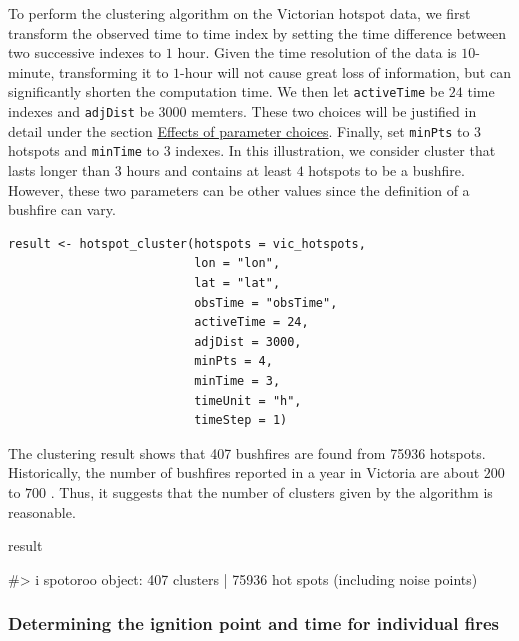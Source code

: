 To perform the clustering algorithm on the Victorian hotspot data, we
first transform the observed time to time index by setting the time
difference between two successive indexes to \(1\) hour. Given the time
resolution of the data is \(10\)-minute, transforming it to \(1\)-hour
will not cause great loss of information, but can significantly shorten
the computation time. We then let \texttt{activeTime} be \(24\) time
indexes and \texttt{adjDist} be \(3000\) memters. These two choices will
be justified in detail under the section
\protect\hyperlink{effects-of-parameter-choices}{Effects of parameter
choices}. Finally, set \texttt{minPts} to \(3\) hotspots and
\texttt{minTime} to \(3\) indexes. In this illustration, we consider
cluster that lasts longer than \(3\) hours and contains at least \(4\)
hotspots to be a bushfire. However, these two parameters can be other
values since the definition of a bushfire can vary.

\begin{verbatim}
result <- hotspot_cluster(hotspots = vic_hotspots,
                          lon = "lon",
                          lat = "lat",
                          obsTime = "obsTime",
                          activeTime = 24,
                          adjDist = 3000,
                          minPts = 4,
                          minTime = 3,
                          timeUnit = "h",
                          timeStep = 1)
\end{verbatim}

The clustering result shows that 407 bushfires are found from 75936
hotspots. Historically, the number of bushfires reported in a year in
Victoria are about \(200\) to \(700\) \citep{fireorigin}. Thus, it
suggests that the number of clusters given by the algorithm is
reasonable.

\begin{Schunk}
\begin{Sinput}
result
\end{Sinput}
\begin{Soutput}
#> i spotoroo object: 407 clusters | 75936 hot spots (including noise points)
\end{Soutput}
\end{Schunk}

\hypertarget{determining-the-ignition-point-and-time-for-individual-fires}{%
\subsubsection{Determining the ignition point and time for individual
fires}\label{determining-the-ignition-point-and-time-for-individual-fires}}

